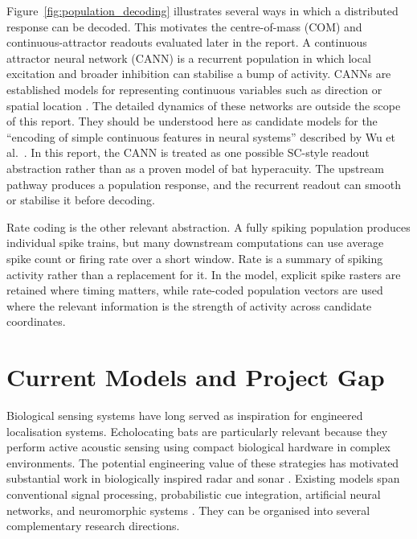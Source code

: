 Figure~\ref{fig:population_decoding} illustrates several ways in which a distributed response can be decoded. This motivates the centre-of-mass (COM) and continuous-attractor readouts evaluated later in the report. A continuous attractor neural network (CANN) is a recurrent population in which local excitation and broader inhibition can stabilise a bump of activity. CANNs are established models for representing continuous variables such as direction or spatial location \cite{ContinuousScholarpedia,Li2024DynamicsNetworks,Wu2016ContinuousRepresentation}. The detailed dynamics of these networks are outside the scope of this report. They should be understood here as candidate models for the ``encoding of simple continuous features in neural systems'' described by Wu et al.\ \cite{Wu2016ContinuousRepresentation}. In this report, the CANN is treated as one possible SC-style readout abstraction rather than as a proven model of bat hyperacuity. The upstream pathway produces a population response, and the recurrent readout can smooth or stabilise it before decoding.

Rate coding is the other relevant abstraction. A fully spiking population produces individual spike trains, but many downstream computations can use average spike count or firing rate over a short window. Rate is a summary of spiking activity rather than a replacement for it. In the model, explicit spike rasters are retained where timing matters, while rate-coded population vectors are used where the relevant information is the strength of activity across candidate coordinates.

\section{Current Models and Project Gap}

Biological sensing systems have long served as inspiration for engineered localisation systems. Echolocating bats are particularly relevant because they perform active acoustic sensing using compact biological hardware in complex environments. The potential engineering value of these strategies has motivated substantial work in biologically inspired radar and sonar \cite{Balleri2017Biologically-inspiredNature}. Existing models span conventional signal processing, probabilistic cue integration, artificial neural networks, and neuromorphic systems \cite{Li2003ALocalization,Willert2006ALocalization,Carlini2024AuditoryReview}. They can be organised into several complementary research directions.

